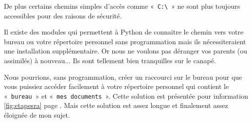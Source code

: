 De plus certains chemins simples d'accès comme «~\Verb+C:\+~» ne sont plus toujours accessibles pour des raisons de sécurité.

Il existe des modules qui permettent à Python de connaitre le chemin vers votre bureau ou votre répertoire personnel sans programmation mais ils nécessiteraient une installation supplémentaire. Or nous ne voulons pas déranger vos parents (ou assimilés) à nouveau... Ils sont tellement bien tranquilles sur le canapé.

Nous pourrions, sans programmation, créer un raccourci sur le bureau pour que vous puissiez accéder facilement à votre répertoire personnel qui contient le «~\texttt{bureau}~»  et «~\texttt{mes documents}~». Cette solution est présentée pour information \autoref{fig:etapesra} page \pageref{fig:etapesra}. Mais cette solution est assez longue et finalement assez éloignée de mon sujet.

